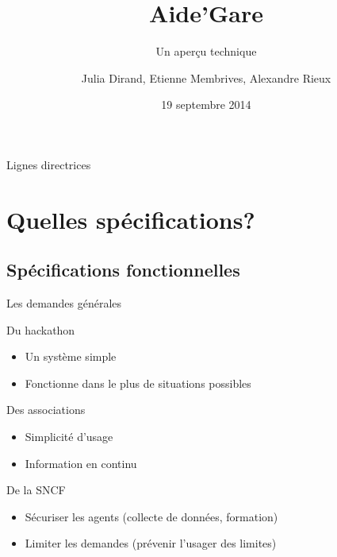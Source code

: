 \documentclass{beamer}
\title{Aide'Gare}
\subtitle{Un aperçu technique}
\author{Julia Dirand, Etienne Membrives, Alexandre Rieux}
\institute{Hackcess Angels}
\date{19 septembre 2014}
\begin{document}
\begin{frame}
  \titlepage
\end{frame}

\begin{frame}{Lignes directrices}
  \setcounter{tocdepth}{3} %
  \tableofcontents
\end{frame}

\section{Quelles spécifications?}
\subsection{Spécifications fonctionnelles}
\begin{frame}{Les demandes générales}
    \begin{block}{Du hackathon}
		\begin{itemize}
			\item Un système simple
			\item Fonctionne dans le plus de situations possibles
		\end{itemize}
    \end{block}
    \begin{block}{Des associations}
		\begin{itemize}
			\item Simplicité d'usage
			\item Information en continu
		\end{itemize}
    \end{block}
    \begin{block}{De la SNCF}
		\begin{itemize}
			\item Sécuriser les agents (collecte de données, formation)
			\item Limiter les demandes (prévenir l'usager des limites)
		\end{itemize}
	\end{block}
\end{frame}
 
\end{document}
